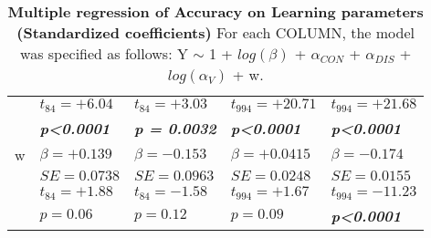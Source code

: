 \begin{table}
\begin{tabular}{r|llll}
&$t_{84}=+6.04$&$t_{84}=+3.03$&$t_{994}=+20.71$&$t_{994}=+21.68$\\
&\textbf{\textit{p\textless0.0001}}&\textbf{\textit{p = 0.0032}}&\textbf{\textit{p\textless0.0001}}&\textbf{\textit{p\textless0.0001}}\\
\hline w&$\beta=+0.139$&$\beta=-0.153$&$\beta=+0.0415$&$\beta=-0.174$\\
&$SE=0.0738$&$SE=0.0963$&$SE=0.0248$&$SE=0.0155$\\
&$t_{84}=+1.88$&$t_{84}=-1.58$&$t_{994}=+1.67$&$t_{994}=-11.23$\\
&$p=0.06$&$p=0.12$&$p=0.09$&\textbf{\textit{p\textless0.0001}}\\
\hline \hline
\end{tabular}
\caption{\textbf{Multiple regression of Accuracy on Learning parameters (Standardized coefficients)} For each COLUMN, the model was specified as follows: Y $\sim$ 1 + $log(\beta)$ + $\alpha_{CON}$ + $\alpha_{DIS}$ + $log(\alpha_V)$ + w.}
\label{tab:Multiple regressionAccuracy}
\end{table}
% 
% 
